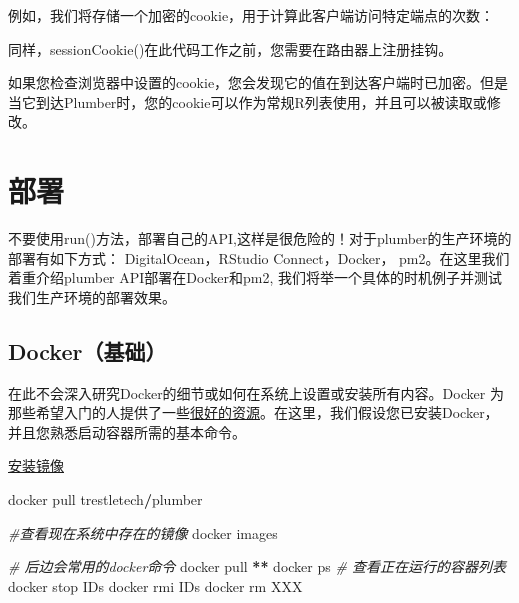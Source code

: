\documentclass[]{book}
\newenvironment{Shaded}{\begin{snugshade}}{\end{snugshade}}
\newcommand{\KeywordTok}[1]{\textcolor[rgb]{0.13,0.29,0.53}{\textbf{#1}}}
\newcommand{\DecValTok}[1]{\textcolor[rgb]{0.00,0.00,0.81}{#1}}
\newcommand{\StringTok}[1]{\textcolor[rgb]{0.31,0.60,0.02}{#1}}
\newcommand{\CommentTok}[1]{\textcolor[rgb]{0.56,0.35,0.01}{\textit{#1}}}
\newcommand{\ControlFlowTok}[1]{\textcolor[rgb]{0.13,0.29,0.53}{\textbf{#1}}}
\newcommand{\OperatorTok}[1]{\textcolor[rgb]{0.81,0.36,0.00}{\textbf{#1}}}
\newcommand{\NormalTok}[1]{#1}
\begin{document}
例如，我们将存储一个加密的cookie，用于计算此客户端访问特定端点的次数：

\begin{Shaded}
\end{Shaded}

同样，sessionCookie()在此代码工作之前，您需要在路由器上注册挂钩。

如果您检查浏览器中设置的cookie，您会发现它的值在到达客户端时已加密。但是当它到达Plumber时，您的cookie可以作为常规R列表使用，并且可以被读取或修改。

\section{部署}

不要使用run()方法，部署自己的API,这样是很危险的！对于plumber的生产环境的部署有如下方式：
DigitalOcean，RStudio Connect，Docker， pm2。在这里我们着重介绍plumber
API部署在Docker和pm2,
我们将举一个具体的时机例子并测试我们生产环境的部署效果。

\subsection{Docker（基础）}\label{docker}

在此不会深入研究Docker的细节或如何在系统上设置或安装所有内容。Docker
为那些希望入门的人提供了一些\href{https://docs.docker.com/}{很好的资源}。在这里，我们假设您已安装Docker，并且您熟悉启动容器所需的基本命令。

\href{https://hub.docker.com/r/trestletech/plumber/}{安装镜像}

\begin{Shaded}
\begin{Highlighting}[]
\NormalTok{docker pull trestletech}\OperatorTok{/}\NormalTok{plumber}

\CommentTok{#查看现在系统中存在的镜像}
\NormalTok{docker images }

\CommentTok{# 后边会常用的docker命令}
\NormalTok{docker pull }\OperatorTok{**}
\NormalTok{docker ps }\CommentTok{# 查看正在运行的容器列表}
\NormalTok{docker stop IDs}
\NormalTok{docker rmi IDs}
\NormalTok{docker rm XXX}
\end{Highlighting}
\end{Shaded}
\end{document}

